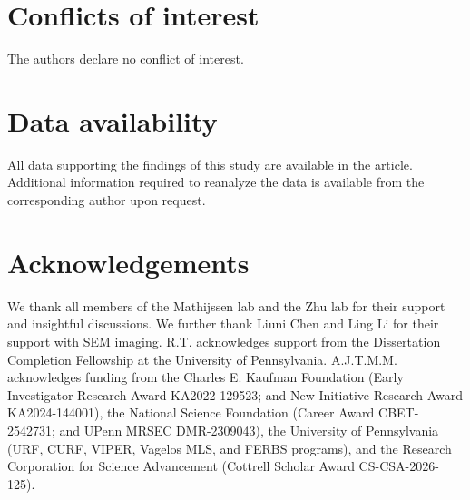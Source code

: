 \documentclass[twoside,twocolumn,9pt]{article}
\begin{document}
\section*{Conflicts of interest}
The authors declare no conflict of interest.

\section*{Data availability}
All data supporting the findings of this study are available in the article. Additional information required to reanalyze the data is available from the corresponding author upon request.

\section*{Acknowledgements}

We thank all members of the Mathijssen lab and the Zhu lab for their support and insightful discussions. We further thank Liuni Chen and Ling Li for their support with SEM imaging. R.T. acknowledges support from the Dissertation Completion Fellowship at the University of Pennsylvania. A.J.T.M.M. acknowledges funding from the Charles E. Kaufman Foundation (Early Investigator Research Award KA2022-129523; and New Initiative Research Award KA2024-144001), the National Science Foundation (Career Award CBET-2542731; and UPenn MRSEC DMR-2309043), the University of Pennsylvania (URF, CURF, VIPER, Vagelos MLS, and FERBS programs), and the Research Corporation for Science Advancement (Cottrell Scholar Award CS-CSA-2026-125).

\balance


\end{document}
